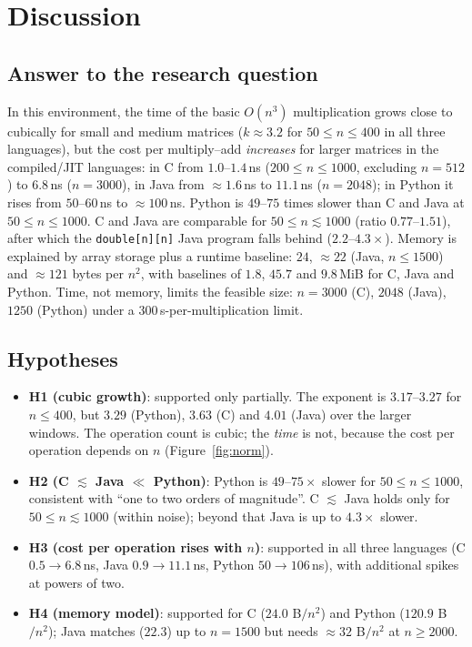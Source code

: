 \section{Discussion}

\subsection{Answer to the research question}
In this environment, the time of the basic $O(n^3)$ multiplication grows close to cubically for small and medium
matrices ($k\approx3.2$ for $50\le n\le400$ in all three languages), but the cost per multiply--add \emph{increases}
for larger matrices in the compiled/JIT languages: in C from $1.0$--$1.4$\,ns ($200\le n\le1000$, excluding $n=512$) to $6.8$\,ns
($n=3000$), in Java from $\approx1.6$\,ns to $11.1$\,ns ($n=2048$); in Python it rises from $50$--$60$\,ns to
$\approx100$\,ns. Python is $49$--$75$ times slower than C and Java at $50\le n\le1000$. C and Java are
comparable for $50\le n\lesssim1000$ (ratio $0.77$--$1.51$), after which the \texttt{double[n][n]} Java program falls behind
($2.2$--$4.3\times$). Memory is explained by array storage plus a runtime baseline: $24$, $\approx22$ (Java, $n\le1500$) and
$\approx121$ bytes per $n^2$, with baselines of $1.8$, $45.7$ and $9.8$\,MiB for C, Java and Python. Time, not memory, limits
the feasible size: $n=3000$ (C), $2048$ (Java), $1250$ (Python) under a $300$\,s-per-multiplication limit.

\subsection{Hypotheses}
\begin{itemize}
  \item \textbf{H1 (cubic growth)}: supported only partially. The exponent is $3.17$--$3.27$ for $n\le400$, but $3.29$ (Python),
        $3.63$ (C) and $4.01$ (Java) over the larger windows. The operation count is cubic; the \emph{time} is not, because the cost
        per operation depends on $n$ (Figure~\ref{fig:norm}).
  \item \textbf{H2 (C $\lesssim$ Java $\ll$ Python)}: Python is $49$--$75\times$ slower for $50\le n\le1000$, consistent with ``one to two orders
        of magnitude''. C $\lesssim$ Java holds only for $50\le n\lesssim1000$ (within noise); beyond that Java is up to $4.3\times$ slower.
  \item \textbf{H3 (cost per operation rises with $n$)}: supported in all three languages (C $0.5\to6.8$\,ns, Java $0.9\to11.1$\,ns,
        Python $50\to106$\,ns), with additional spikes at powers of two.
  \item \textbf{H4 (memory model)}: supported for C ($24.0$ B$/n^2$) and Python ($120.9$ B$/n^2$); Java matches ($22.3$) up to $n=1500$ but
        needs $\approx32$ B$/n^2$ at $n\ge2000$.
\end{itemize}

